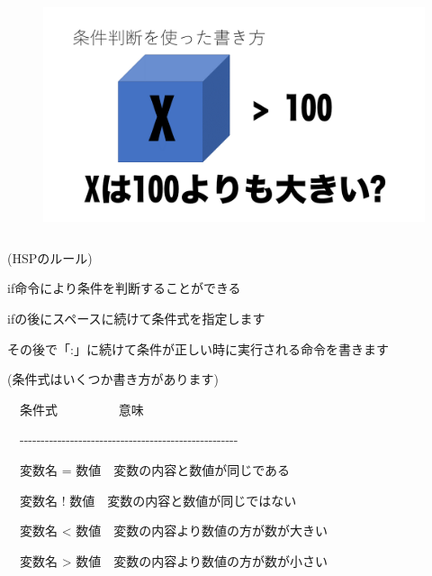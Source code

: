 \begin{figure}[H]
    \begin{center}
        \includegraphics[keepaspectratio,width=12.33cm,height=6.939cm]{text02-img/text02-img049.png}
    \end{center}
\end{figure}

\begin{description}
    \item (HSPのルール)
\end{description}

\begin{description}
    \item if命令により条件を判断することができる
    \item ifの後にスペースに続けて条件式を指定します
    \item その後で「:」に続けて条件が正しい時に実行される命令を書きます
\end{description}

\begin{description}
    \item (条件式はいくつか書き方があります)
\end{description}

\begin{description}
    \item \ \ 条件式 \ \ \ \ \ \ \ \ \ 意味
    \item \ \ {}-{}-{}-{}-{}-{}-{}-{}-{}-{}-{}-{}-{}-{}-{}-{}-{}-{}-{}-{}-{}-{}-{}-{}-{}-{}-{}-{}-{}-{}-{}-{}-{}-{}-{}-{}-{}-{}-{}-{}-{}-{}-{}-{}-{}-{}-{}-{}-{}-{}-{}-{}-
    \item \ \ 変数名 = 数値\ \ 変数の内容と数値が同じである
    \item \ \ 変数名 ! 数値\ \ 変数の内容と数値が同じではない
    \item \ \ 変数名 {\textless} 数値\ \ 変数の内容より数値の方が数が大きい
    \item \ \ 変数名 {\textgreater} 数値\ \ 変数の内容より数値の方が数が小さい
\end{description}

